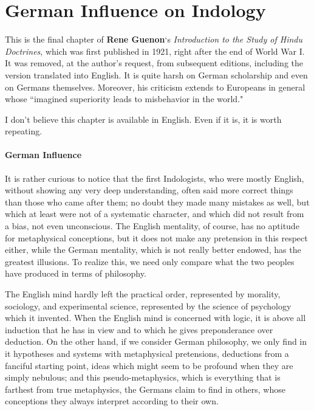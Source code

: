 \section{German Influence on Indology}

\begin{quotex}
This is the final chapter of \textbf{Rene Guenon}`s \emph{Introduction to the Study of Hindu Doctrines}, which was first published in 1921, right after the end of World War I. It was removed, at the author's request, from subsequent editions, including the version translated into English. It is quite harsh on German scholarship and even on Germans themselves. Moreover, his criticism extends to Europeans in general whose ``imagined superiority leads to misbehavior in the world."

I don't believe this chapter is available in English. Even if it is, it is worth repeating. 

\end{quotex}
\paragraph{German Influence}
It is rather curious to notice that the first Indologists, who were mostly English, without showing any very deep understanding, often said more correct things than those who came after them; no doubt they made many mistakes as well, but which at least were not of a systematic character, and which did not result from a bias, not even unconscious. The English mentality, of course, has no aptitude for metaphysical conceptions, but it does not make any pretension in this respect either, while the German mentality, which is not really better endowed, has the greatest illusions. To realize this, we need only compare what the two peoples have produced in terms of philosophy.

The English mind hardly left the practical order, represented by morality, sociology, and experimental science, represented by the science of psychology which it invented. When the English mind is concerned with logic, it is above all induction that he has in view and to which he gives preponderance over deduction. On the other hand, if we consider German philosophy, we only find in it hypotheses and systems with metaphysical pretensions, deductions from a fanciful starting point, ideas which might seem to be profound when they are simply nebulous; and this pseudo-metaphysics, which is everything that is farthest from true metaphysics, the Germans claim to find in others, whose conceptions they always interpret according to their own.

